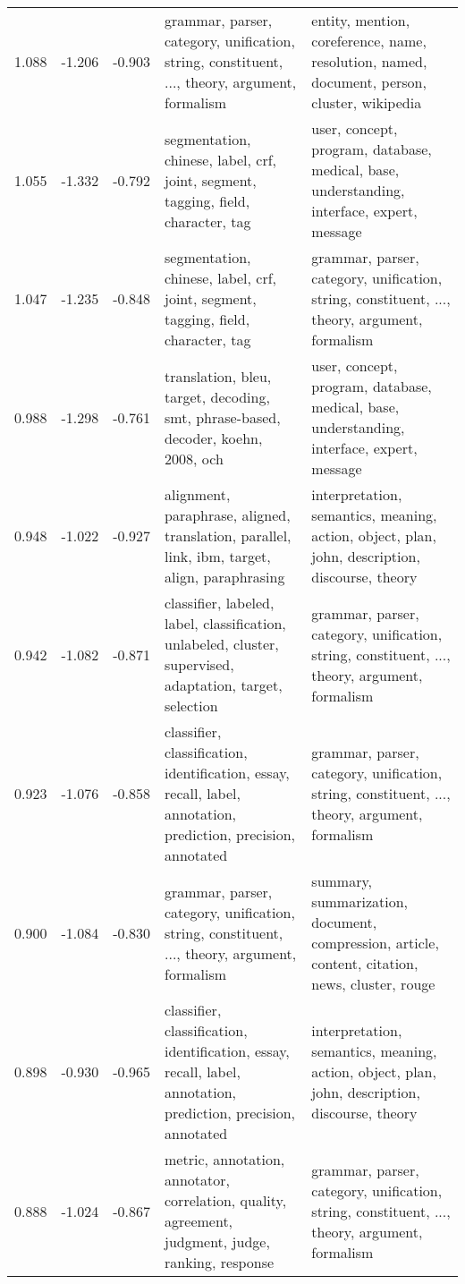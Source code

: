 \begin{tabular}{cccp{5cm}p{5cm}}
1.088 & -1.206 & -0.903 & grammar, parser, category, unification, string, constituent, ..., theory, argument, formalism & entity, mention, coreference, name, resolution, named, document, person, cluster, wikipedia \\
1.055 & -1.332 & -0.792 & segmentation, chinese, label, crf, joint, segment, tagging, field, character, tag & user, concept, program, database, medical, base, understanding, interface, expert, message \\
1.047 & -1.235 & -0.848 & segmentation, chinese, label, crf, joint, segment, tagging, field, character, tag & grammar, parser, category, unification, string, constituent, ..., theory, argument, formalism \\
0.988 & -1.298 & -0.761 & translation, bleu, target, decoding, smt, phrase-based, decoder, koehn, 2008, och & user, concept, program, database, medical, base, understanding, interface, expert, message \\
0.948 & -1.022 & -0.927 & alignment, paraphrase, aligned, translation, parallel, link, ibm, target, align, paraphrasing & interpretation, semantics, meaning, action, object, plan, john, description, discourse, theory \\
0.942 & -1.082 & -0.871 & classifier, labeled, label, classification, unlabeled, cluster, supervised, adaptation, target, selection & grammar, parser, category, unification, string, constituent, ..., theory, argument, formalism \\
0.923 & -1.076 & -0.858 & classifier, classification, identification, essay, recall, label, annotation, prediction, precision, annotated & grammar, parser, category, unification, string, constituent, ..., theory, argument, formalism \\
0.900 & -1.084 & -0.830 & grammar, parser, category, unification, string, constituent, ..., theory, argument, formalism & summary, summarization, document, compression, article, content, citation, news, cluster, rouge \\
0.898 & -0.930 & -0.965 & classifier, classification, identification, essay, recall, label, annotation, prediction, precision, annotated & interpretation, semantics, meaning, action, object, plan, john, description, discourse, theory \\
0.888 & -1.024 & -0.867 & metric, annotation, annotator, correlation, quality, agreement, judgment, judge, ranking, response & grammar, parser, category, unification, string, constituent, ..., theory, argument, formalism \\

\end{tabular}
